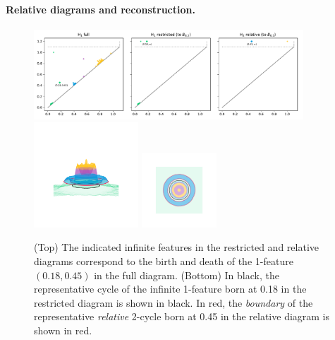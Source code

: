 \paragraph*{Relative diagrams and reconstruction.}

\begin{figure}[htbp]
  \centering
  \includegraphics[width=0.9\textwidth]{scripts/figures/relative/dgm-0_0.pdf}
  \includegraphics[trim=500 800 500 800, clip, width=0.35\textwidth]{scripts/figures/relative/surf_side-0_0.png}
  \includegraphics[trim=500 500 500 500, clip, width=0.25\textwidth]{scripts/figures/relative/surf_top-0_0.png}
  \caption{(Top) The indicated infinite features in the restricted and relative diagrams correspond to the birth and death of the 1-feature $(0.18, 0.45)$ in the full diagram.
  (Bottom) In black, the representative cycle of the infinite 1-feature born at 0.18 in the restricted diagram is shown in black.
  In red, the \emph{boundary} of the representative \emph{relative} 2-cycle born at 0.45 in the relative diagram is shown in red.}\label{fig:relative1}
\end{figure}

